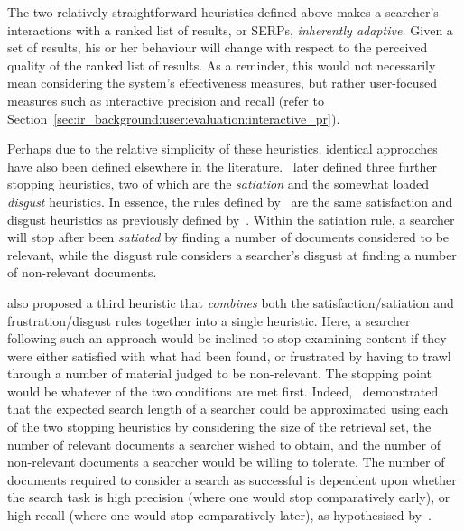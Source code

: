 The two relatively straightforward heuristics defined above makes a searcher's interactions with a ranked list of results, or SERPs, \emph{inherently adaptive.} Given a set of results, his or her behaviour will change with respect to the perceived quality of the ranked list of results. As a reminder, this would not necessarily mean considering the system's effectiveness measures, but rather user-focused measures such as interactive precision and recall (refer to Section~\ref{sec:ir_background:user:evaluation:interactive_pr}).

\noindent{}
Perhaps due to the relative simplicity of these heuristics, identical approaches have also been defined elsewhere in the literature.~\cite{kraft1979stopping_rules} later defined three further stopping heuristics, two of which are the \emph{satiation} and the somewhat loaded \emph{disgust} heuristics. In essence, the rules defined by~\cite{kraft1979stopping_rules} are the same satisfaction and disgust heuristics as previously defined by~\cite{cooper1973retrieval_effectiveness_ii}. Within the satiation rule, a searcher will stop after been \emph{satiated} by finding a number of documents considered to be relevant, while the disgust rule considers a searcher's disgust at finding a number of non-relevant documents.

\cite{kraft1979stopping_rules} also proposed a third heuristic that \emph{combines} both the satisfaction/satiation and frustration/disgust rules together into a single heuristic. Here, a searcher following such an approach would be inclined to stop examining content if they were either satisfied with what had been found, or frustrated by having to trawl through a number of material judged to be non-relevant. The stopping point would be whatever of the two conditions are met first. Indeed,~\cite{kraft1979stopping_rules} demonstrated that the expected search length of a searcher could be approximated using each of the two stopping heuristics by considering the size of the retrieval set, the number of relevant documents a searcher wished to obtain, and the number of non-relevant documents a searcher would be willing to tolerate. The number of documents required to consider a search as successful is dependent upon whether the search task is high precision (where one would stop comparatively early), or high recall (where one would stop comparatively later), as hypothesised by~\cite{bates1984thirty_items}.

